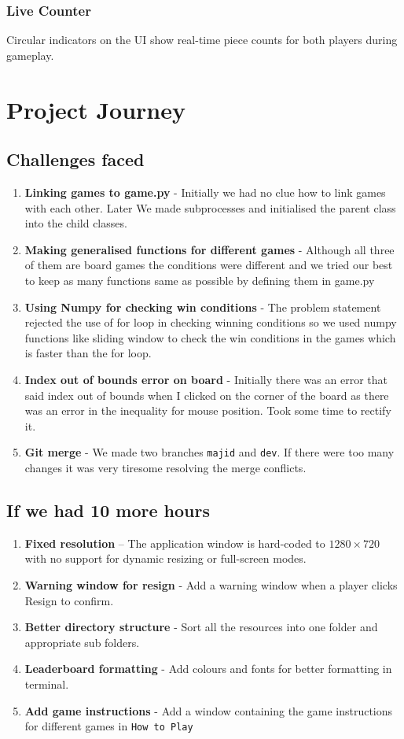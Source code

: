 \documentclass[12pt]{article}
\begin{document}
\subsubsection*{Live Counter}
Circular indicators on the UI show real-time piece counts for both players during gameplay.

\section{Project Journey}
\subsection{Challenges faced}
\begin{enumerate}
    \item \textbf{Linking games to game.py} - Initially we had no clue how to link games with each other. Later We made subprocesses and initialised the parent class into the child classes.
    \item \textbf{Making generalised functions for different games} - Although all three of them are board games the conditions were different and we tried our best to keep as many functions same as possible by defining them in \texttt{}{game.py}
    \item \textbf{Using Numpy for checking win conditions}  - The problem statement rejected the use of for loop in checking winning conditions so we used numpy functions like sliding window to check the win conditions in the games which is faster than the for loop.
    \item \textbf{Index out of bounds error on board} - Initially there was an error that said index out of bounds when I clicked on the corner of the board as there was an error in the inequality for mouse position. Took some time to rectify it.
    \item \textbf{Git merge} - We made two branches \texttt{majid} and \texttt{dev}. If there were too many changes it was very tiresome resolving the merge conflicts.
\end{enumerate}
\subsection{If we had 10 more hours}

\begin{enumerate}
    \item \textbf{Fixed resolution} – The application window is hard-coded to $1280 \times 720$ with no support for dynamic resizing or full-screen modes.
    \item \textbf{Warning window for resign} - Add a warning window when a player clicks Resign to confirm.

    \item \textbf{Better directory structure} - Sort all the resources into one folder and appropriate sub folders.
    \item \textbf{Leaderboard formatting} - Add colours and fonts for better formatting in terminal.
    \item \textbf{Add game instructions} - Add a window containing the game instructions for different games in \texttt{How to Play}
\end{enumerate}
\end{document}
